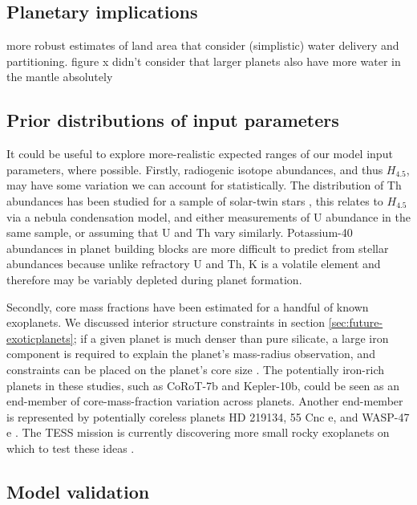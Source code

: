 \subsection{Planetary implications}

more robust estimates of land area that consider (simplistic) water delivery and partitioning. figure x didn't consider that larger planets also have more water in the mantle absolutely


\subsection{Prior distributions of input parameters}

It could be useful to explore more-realistic expected ranges of our model input parameters, where possible. Firstly, radiogenic isotope abundances, and thus $H_{4.5}$, may have some variation we can account for statistically. The distribution of Th abundances has been studied for a sample of solar-twin stars \citep[it varies two-fold;][]{Unterborn2015}, this relates to $H_{4.5}$ via a nebula condensation model, and either measurements of U abundance in the same sample, or assuming that U and Th vary similarly. Potassium-40 abundances in planet building blocks are more difficult to predict from stellar abundances because unlike refractory U and Th, K is a volatile element and therefore may be variably depleted during planet formation.

Secondly, core mass fractions have been estimated for a handful of known exoplanets. We discussed interior structure constraints in section \ref{sec:future-exoticplanets}; if a given planet is much denser than pure silicate, a large iron component is required to explain the planet's mass-radius observation, and constraints can be placed on the planet's core size \citep{Wagner2012, Suissa2018}. The potentially iron-rich planets in these studies, such as CoRoT-7b and Kepler-10b, could be seen as an end-member of core-mass-fraction variation across planets. Another end-member is represented by potentially coreless planets HD 219134, 55 Cnc e, and WASP-47 e \citep{Dorn2019}. The TESS mission is currently discovering more small rocky exoplanets on which to test these ideas \citep[see][]{Jontof-Hutter2019}.






\subsection{Model validation}

